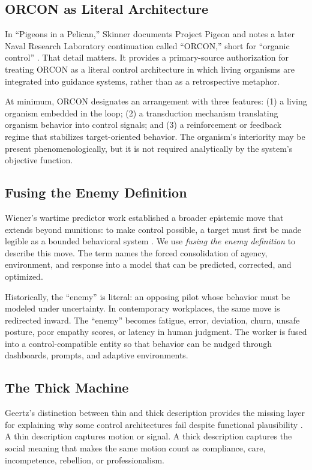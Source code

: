 \documentclass[runningheads]{llncs}
\begin{document}
\subsection{ORCON as Literal Architecture}

In ``Pigeons in a Pelican,'' Skinner documents Project Pigeon and notes a later Naval Research Laboratory continuation called ``ORCON,'' short for ``organic control'' \cite{skinner1960pigeons}. That detail matters. It provides a primary-source authorization for treating ORCON as a literal control architecture in which living organisms are integrated into guidance systems, rather than as a retrospective metaphor.

At minimum, ORCON designates an arrangement with three features: (1) a living organism embedded in the loop; (2) a transduction mechanism translating organism behavior into control signals; and (3) a reinforcement or feedback regime that stabilizes target-oriented behavior. The organism's interiority may be present phenomenologically, but it is not required analytically by the system's objective function.

\subsection{Fusing the Enemy Definition}

Wiener's wartime predictor work established a broader epistemic move that extends beyond munitions: to make control possible, a target must first be made legible as a bounded behavioral system \cite{wiener1948cybernetics}. We use \emph{fusing the enemy definition} to describe this move. The term names the forced consolidation of agency, environment, and response into a model that can be predicted, corrected, and optimized.

Historically, the ``enemy'' is literal: an opposing pilot whose behavior must be modeled under uncertainty. In contemporary workplaces, the same move is redirected inward. The ``enemy'' becomes fatigue, error, deviation, churn, unsafe posture, poor empathy scores, or latency in human judgment. The worker is fused into a control-compatible entity so that behavior can be nudged through dashboards, prompts, and adaptive environments.

\subsection{The Thick Machine}

Geertz's distinction between thin and thick description provides the missing layer for explaining why some control architectures fail despite functional plausibility \cite{geertz1973interpretation}. A thin description captures motion or signal. A thick description captures the social meaning that makes the same motion count as compliance, care, incompetence, rebellion, or professionalism.
\end{document}
